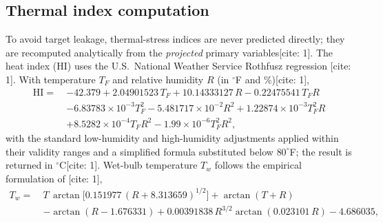 \documentclass[pdflatex,sn-mathphys-ay]{sn-jnl}
\newcommand{\degC}{\ensuremath{^{\circ}\mathrm{C}}}
\begin{document}
\subsection{Thermal index computation}\label{sec:indices}
To avoid target leakage, thermal-stress indices are never predicted directly; they are recomputed analytically from the \emph{projected} primary variables[cite: 1]. The heat index (HI) uses the U.S.\ National Weather Service Rothfusz regression \citep{rothfusz1990}[cite: 1]. With temperature $T_F$ and relative humidity $R$ (in $^{\circ}$F and \%)[cite: 1],
\begin{align}
\mathrm{HI} =\ & -42.379 + 2.04901523\,T_F + 10.14333127\,R - 0.22475541\,T_F R \nonumber\\
   & - 6.83783\!\times\!10^{-3} T_F^{2} - 5.481717\!\times\!10^{-2} R^{2} + 1.22874\!\times\!10^{-3} T_F^{2} R \nonumber\\
   & + 8.5282\!\times\!10^{-4} T_F R^{2} - 1.99\!\times\!10^{-6} T_F^{2} R^{2},
\label{eq:hi}
\end{align}
with the standard low-humidity and high-humidity adjustments applied within their validity ranges and a simplified formula substituted below $80^{\circ}$F; the result is returned in $\degC$[cite: 1]. Wet-bulb temperature $T_w$ follows the empirical formulation of \citet{stull2011}[cite: 1],
\begin{align}
T_w =\ & T\,\arctan\!\big[0.151977\,(R+8.313659)^{1/2}\big] + \arctan(T+R) \nonumber\\
     & - \arctan(R-1.676331) + 0.00391838\,R^{3/2}\arctan(0.023101\,R) - 4.686035,
\label{eq:wetbulb}
\end{align}
\end{document}
